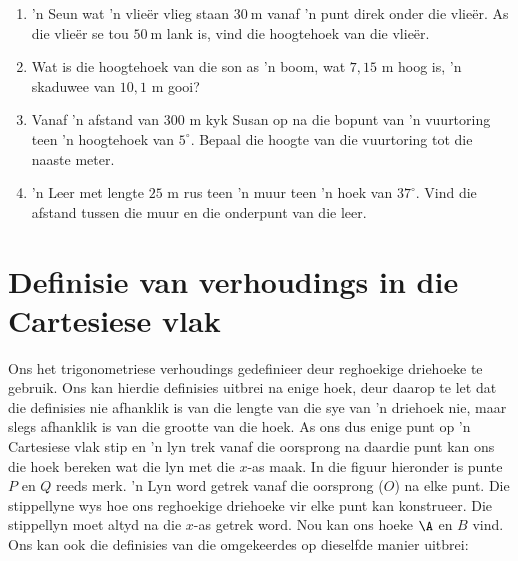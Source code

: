\begin{exercises}{}
{
\begin{enumerate}[noitemsep, label=\textbf{\arabic*}. ] 

\item 'n Seun wat 'n vlie\"er vlieg staan $30~$m vanaf 'n punt direk onder die vlie\"er. As die vlie\"er se tou $50~$m lank is, vind die hoogtehoek van die vlie\"er.
\item Wat is die hoogtehoek van die son as 'n boom, wat $7,15$ m hoog is, 'n skaduwee van $10,1$ m gooi?
\item Vanaf 'n afstand van $300$ m kyk Susan op na die bopunt van 'n vuurtoring teen 'n hoogtehoek van $5^{\circ}$. Bepaal die hoogte van die vuurtoring tot die naaste meter.
\item 'n Leer met lengte $25$ m rus teen 'n muur teen 'n hoek van $37^{\circ}$. Vind die afstand tussen die muur en die onderpunt van die leer. 

\end{enumerate}

    
}
\end{exercises} 



\section{Definisie van verhoudings in die Cartesiese vlak}

Ons het trigonometriese verhoudings gedefinieer deur reghoekige driehoeke te gebruik. Ons kan hierdie definisies uitbrei na enige hoek, deur daarop te let dat die definisies nie afhanklik is van die lengte van die sye van 'n driehoek nie, maar slegs afhanklik is van die grootte van die hoek. As ons dus enige punt op 'n Cartesiese vlak stip en 'n lyn trek vanaf die oorsprong na daardie punt kan ons die hoek bereken wat die lyn met die $x$-as maak. In die figuur hieronder is punte $P$ en $Q$ reeds merk. 'n Lyn word getrek vanaf die oorsprong ($O$) na elke punt. Die stippellyne wys hoe ons reghoekige driehoeke vir elke punt kan konstrueer. Die stippellyn moet altyd na die $x$-as getrek word. Nou kan ons hoeke $\A$ en $B$ vind. Ons kan ook die definisies van die omgekeerdes op dieselfde manier uitbrei:




